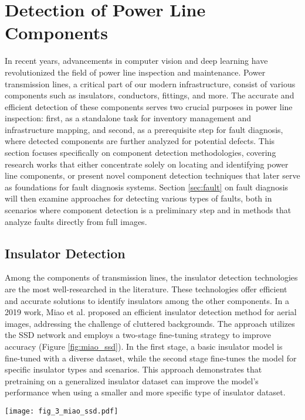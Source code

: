 \section{Detection of Power Line Components }\label{sec:components}
In recent years, advancements in computer vision and deep learning have revolutionized the field of power line inspection and maintenance. Power transmission lines, a critical part of our modern infrastructure, consist of various components such as insulators, conductors, fittings, and more. 
The accurate and efficient detection of these components serves two crucial purposes in power line inspection: first, as a standalone task for inventory management and infrastructure mapping, and second, as a prerequisite step for fault diagnosis, where detected components are further analyzed for potential defects. This section focuses specifically on component detection methodologies, covering research works that either concentrate solely on locating and identifying power line components, or present novel component detection techniques that later serve as foundations for fault diagnosis systems. Section \ref{sec:fault} on fault diagnosis will then examine approaches for detecting various types of faults, both in scenarios where component detection is a preliminary step and in methods that analyze faults directly from full images.

\subsection{Insulator Detection}
Among the components of transmission lines, the insulator detection technologies are the most well-researched in the literature. These technologies offer efficient and accurate solutions to identify insulators among the other components. In a 2019 work, Miao et al. \cite{miao_insulator_2019} proposed an efficient insulator detection method for aerial images, addressing the challenge of cluttered backgrounds. The approach utilizes the SSD network and employs a two-stage fine-tuning strategy to improve accuracy (Figure \ref{fig:miao_ssd}). In the first stage, a basic insulator model is fine-tuned with a diverse dataset, while the second stage fine-tunes the model for specific insulator types and scenarios. This approach demonstrates that pretraining on a generalized insulator dataset can improve the model's performance when using a smaller and more specific type of insulator dataset.

\begin{figure*}[htb]
    \centering
    \texttt{[image: fig\_3\_miao\_ssd.pdf]}
    \caption{Overall process of the two stage insulator detection using the SSD network \cite{miao_insulator_2019}.}
    \label{fig:miao_ssd}
\end{figure*}

